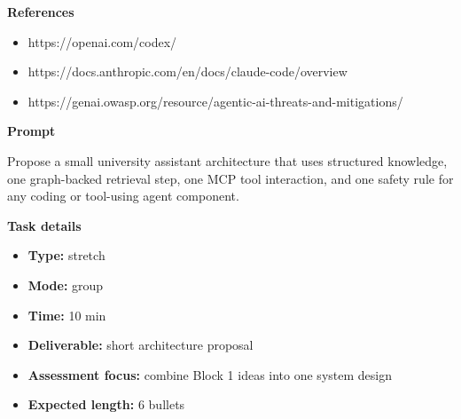 \documentclass[11pt]{article}
\begin{document}
\begin{tcolorbox}[colback=white,colframe=MidnightBlue,title={Q7 Coding-Agent Safety Review},fonttitle=\bfseries,breakable]
{\large\bfseries\color{MidnightBlue} References}\par\medskip
\begin{itemize}\item https://openai.com/codex/
\item https://docs.anthropic.com/en/docs/claude-code/overview
\item https://genai.owasp.org/resource/agentic-ai-threats-and-mitigations/\end{itemize}
\end{tcolorbox}

\begin{tcolorbox}[colback=white,colframe=MidnightBlue,title={Q8 Stretch Synthesis},fonttitle=\bfseries,breakable]
\begin{center}
\end{center}

{\large\bfseries\color{MidnightBlue} Prompt}\par\medskip
Propose a small university assistant architecture that uses structured knowledge, one graph-backed retrieval step, one MCP tool interaction, and one safety rule for any coding or tool-using agent component.

{\large\bfseries\color{MidnightBlue} Task details}\par\medskip
\begin{itemize}\item \textbf{Type:} stretch
\item \textbf{Mode:} group
\item \textbf{Time:} 10 min
\item \textbf{Deliverable:} short architecture proposal
\item \textbf{Assessment focus:} combine Block 1 ideas into one system design
\item \textbf{Expected length:} 6 bullets\end{itemize}


\end{tcolorbox}
\end{document}
